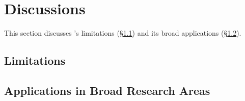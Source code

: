 \section{Discussions}\label{sec:discuss}

This section discusses \xxx's limitations (\S\ref{sec:limits}) and its broad 
applications (\S\ref{sec:apps}).

\subsection{Limitations}\label{sec:limits}






\subsection{Applications in Broad Research Areas}\label{sec:apps}




